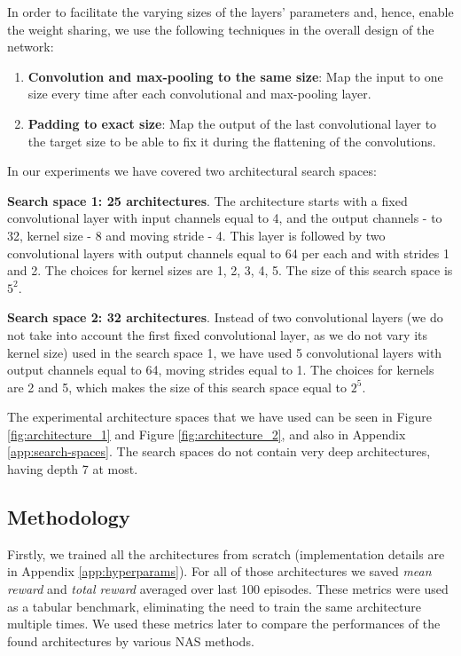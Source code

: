 \documentclass{svproc}
\begin{document}
In order to facilitate the varying sizes of the layers' parameters and, hence, enable the weight sharing, we use the following techniques in the overall design of the network:
\begin{enumerate}
  \item \textbf{Convolution and max-pooling to the same size}:
  Map the input to one size every time after each convolutional and max-pooling layer. 
\item \textbf{Padding to exact size}:
  Map the output of the last convolutional layer to the target size to be able to fix it during the flattening of the convolutions.
  
\end{enumerate}

In our experiments we have covered two architectural search spaces:

\textbf{Search space 1: 25 architectures}.
The architecture starts with a fixed convolutional layer with input channels equal to 4, and the output channels - to 32, kernel size - 8 and moving stride - 4.
This layer is followed by two convolutional layers with output channels equal to 64 per each and with strides 1 and 2. The choices for kernel sizes are 1, 2, 3, 4, 5. The size of this search space is $5^2$.

\textbf{Search space 2: 32 architectures}.
Instead of two convolutional layers (we do not take into account the first fixed convolutional layer, as we do not vary its kernel size) used in the search space 1, we have used 5 convolutional layers with output channels equal to 64, moving strides equal to 1. The choices for kernels are 2 and 5, which makes the size of this search space equal to $2^5$.

The experimental architecture spaces that we have used can be seen in Figure \ref{fig:architecture_1} and Figure \ref{fig:architecture_2}, and also in Appendix \ref{app:search-spaces}.
The search spaces do not contain very deep architectures, having depth 7 at most.

\subsection{Methodology}
Firstly, we trained all the architectures from scratch (implementation details are in Appendix \ref{app:hyperparams}). For all of those architectures we saved \textit{mean reward} and \textit{total reward} averaged over last 100 episodes. 
These metrics were used as a tabular benchmark, eliminating the need to train the same architecture multiple times.
We used these metrics later to compare the performances of the found architectures by various NAS methods.
\end{document}
